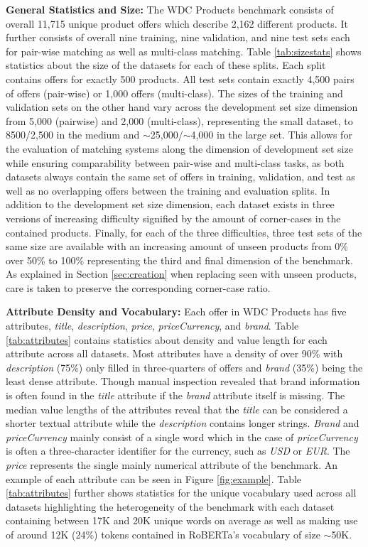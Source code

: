 \documentclass[sigconf,edbt]{acmart-edbt2024}
\begin{document}
 \textbf{General Statistics and Size:} The WDC Products benchmark consists of overall 11,715 unique product offers which describe 2,162 different products. It further consists of overall nine training, nine validation, and nine test sets each for pair-wise matching as well as multi-class matching. Table \ref{tab:sizestats} shows statistics about the size of the datasets for each of these splits. Each split contains offers for exactly 500 products. All test sets contain exactly 4,500 pairs of offers (pair-wise) or 1,000 offers (multi-class). The sizes of the training and validation sets on the other hand vary across the development set size dimension from 5,000 (pairwise) and 2,000 (multi-class), representing the small dataset, to 8500/2,500 in the medium and $\sim$25,000/$\sim$4,000 in the large set. This allows for the evaluation of matching systems along the dimension of development set size while ensuring comparability between pair-wise and multi-class tasks, as both datasets always contain the same set of offers in training, validation, and test as well as no overlapping offers between the training and evaluation splits. In addition to the development set size dimension, each dataset exists in three versions of increasing difficulty signified by the amount of corner-cases in the contained products. Finally, for each of the three difficulties, three test sets of the same size are available with an increasing amount of unseen products from 0\% over 50\% to 100\% representing the third and final dimension of the benchmark. As explained in Section \ref{sec:creation} when replacing seen with unseen products, care is taken to preserve the corresponding corner-case ratio.

\textbf{Attribute Density and Vocabulary:} Each offer in WDC Products has five attributes, \textit{title}, \textit{description}, \textit{price}, \textit{priceCurrency}, and \textit{brand}. Table \ref{tab:attributes} contains statistics about density and value length for each attribute across all datasets. Most attributes have a density of over 90\% with \textit{description} (75\%) only filled in three-quarters of offers and \textit{brand} (35\%) being the least dense attribute. Though manual inspection revealed that brand information is often found in the \textit{title} attribute if the \textit{brand} attribute itself is missing. The median value lengths of the attributes reveal that the \textit{title} can be considered a shorter textual attribute while the \textit{description} contains longer strings. \textit{Brand} and \textit{priceCurrency} mainly consist of a single word which in the case of \textit{priceCurrency} is often a three-character identifier for the currency, such as \textit{USD} or \textit{EUR}. The \textit{price} represents the single mainly numerical attribute of the benchmark. An example of each attribute can be seen in Figure \ref{fig:example}. Table \ref{tab:attributes} further shows statistics for the unique vocabulary used across all datasets highlighting the heterogeneity of the benchmark with each dataset containing between 17K and 20K unique words on average as well as making use of around 12K (24\%) tokens contained in RoBERTa's vocabulary of size $\sim$50K.
\end{document}
